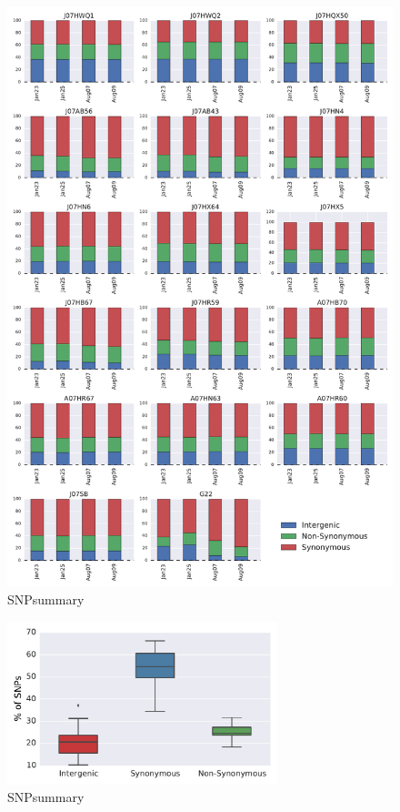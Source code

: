 \begin{figure}[ht]
  \centering
  \includegraphics[width=\textwidth,height=\textheight,keepaspectratio]{Chapter5/Figures/SNPsummary.pdf}
  \caption{SNPsummary}
  \label{SNPsummary}
\end{figure}

\begin{figure}[ht]
  \centering
  \includegraphics[width=0.7\textwidth,keepaspectratio]{Chapter5/Figures/BoxPlot_TypeofSNPs.pdf}
  \caption{SNPsummary}
  \label{BoxPlotSNP}
\end{figure}

